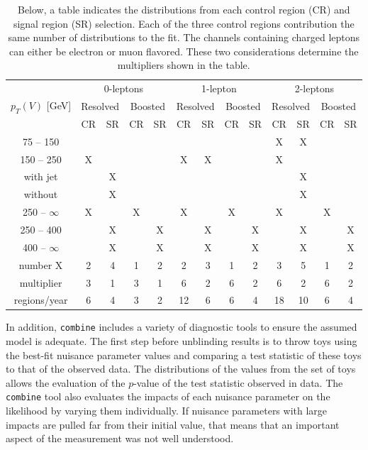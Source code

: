 \begin{table}
  \caption[Counts of distributions for each selection]{
    Below, a table indicates the distributions from each control region (CR) and signal region (SR) selection.
    Each of the three control regions contribution the same number of distributions to the fit.
    The channels containing charged leptons can either be electron or muon flavored.
    These two considerations determine the multipliers shown in the table.
  }
  \begin{tabular}{|c|c|c|c|c|c|c|c|c|c|c|c|c|}
    \hline
    \multirow{3}{*}{$p_T(V)$ [GeV]} & \multicolumn{4}{c|}{0-leptons} & \multicolumn{4}{c|}{1-lepton} & \multicolumn{4}{c|}{2-leptons} \\
    & \multicolumn{2}{c|}{Resolved} & \multicolumn{2}{c|}{Boosted} & \multicolumn{2}{c|}{Resolved} & \multicolumn{2}{c|}{Boosted} & \multicolumn{2}{c|}{Resolved} & \multicolumn{2}{c|}{Boosted} \\
    & CR & SR & CR & SR & CR & SR & CR & SR & CR & SR & CR & SR \\
    \hline
    75 -- 150     &   &   &   &   &   &   &   &   & X & X &   &   \\
    \hline
    150 -- 250    & X &   &   &   & X & X &   &   & X &   &   &   \\
    with jet      &   & X &   &   &   &   &   &   &   & X &   &   \\
    without       &   & X &   &   &   &   &   &   &   & X &   &   \\
    \hline
    250 -- $\infty$ & X &   & X &   & X &   & X &   & X &   & X &   \\
    250 -- 400    &   & X &   & X &   & X &   & X &   & X &   & X \\
    400 -- $\infty$ &   & X &   & X &   & X &   & X &   & X &   & X \\
    \hline
    number X      & 2 & 4 & 1 & 2 & 2 & 3 & 1 & 2 & 3 & 5 & 1 & 2 \\
    multiplier    & 3 & 1 & 3 & 1 & 6 & 2 & 6 & 2 & 6 & 2 & 6 & 2 \\
    regions/year  & 6 & 4 & 3 & 2 & 12 & 6 & 6 & 4 & 18 & 10 & 6 & 4 \\
   \hline
  \end{tabular}
  \label{tab:num-hists}
\end{table}
%

In addition, \texttt{combine} includes a variety of diagnostic tools to ensure
the assumed model is adequate.
The first step before unblinding results is to throw toys using the best-fit
nuisance parameter values and comparing a test statistic of these toys
to that of the observed data.  
The distributions of the values from the set of toys allows the evaluation of the $p$-value
of the test statistic observed in data.
The \texttt{combine} tool also evaluates the impacts of each
nuisance parameter on the likelihood by varying them individually.
If nuisance parameters with large impacts are pulled far from their initial value,
that means that an important aspect of the measurement was not well understood.

